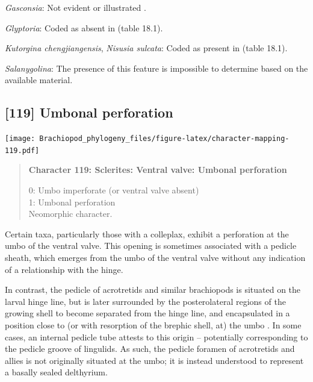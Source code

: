 \documentclass[openany]{book}
\begin{document}
\hypertarget{Gasconsia-coding-118}{}
\emph{Gasconsia}: Not evident or illustrated
\citep{Hanken1985Thetaxonomy}.

\hypertarget{Glyptoria-coding-118}{}
\emph{Glyptoria}: Coded as absent in
\citet{Bassett2001Functionalmorphology} (table 18.1).

\hypertarget{Kutorgina_chengjiangensis-coding-118}{}
\emph{Kutorgina chengjiangensis}, \emph{Nisusia sulcata}: Coded as
present in \citet{Bassett2001Functionalmorphology} (table 18.1).

\hypertarget{Salanygolina-coding-118}{}
\emph{Salanygolina}: The presence of this feature is impossible to
determine based on the available material.

\subsection*{{[}119{]} Umbonal perforation}\label{umbonal-perforation}

\texttt{[image: Brachiopod\_phylogeny\_files/figure-latex/character-mapping-119.pdf]}

\begin{quote}
\textbf{Character 119: Sclerites: Ventral valve: Umbonal perforation}

0: Umbo imperforate (or ventral valve absent)\\
1: Umbonal perforation\\
Neomorphic character.
\end{quote}

Certain taxa, particularly those with a colleplax, exhibit a perforation
at the umbo of the ventral valve. This opening is sometimes associated
with a pedicle sheath, which emerges from the umbo of the ventral valve
without any indication of a relationship with the hinge.

In contrast, the pedicle of acrotretids and similar brachiopods is
situated on the larval hinge line, but is later surrounded by the
posterolateral regions of the growing shell to become separated from the
hinge line, and encapsulated in a position close to (or with resorption
of the brephic shell, at) the umbo \citep[see][pp.~407--411 and fig. 3
for discussion]{Popov1992TheCambrian}. In some cases, an internal
pedicle tube attests to this origin -- potentially corresponding to the
pedicle groove of lingulids. As such, the pedicle foramen of acrotretids
and allies is not originally situated at the umbo; it is instead
understood to represent a basally sealed delthyrium.
\end{document}
